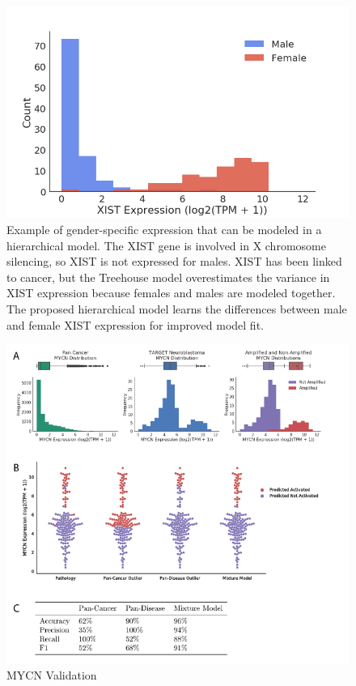 \documentclass[fleqn,10pt]{wlscirep}
\begin{document}
\begin{figure}
\centering
\includegraphics[width=0.75\linewidth]{images/xist-fig-2017-12-28.png}
\caption{Example of gender-specific expression that can be modeled in a hierarchical model. The XIST gene is involved in X chromosome silencing, so XIST is not expressed for males. XIST has been linked to cancer, but the Treehouse model overestimates the variance in XIST expression because females and males are modeled together. The proposed hierarchical model learns the differences between male and female XIST expression for improved model fit.}
\label{sfig:xist}
\end{figure}



\begin{figure}
	\centering
	\includegraphics[width=0.75\linewidth]{images/MYCN-Figure.png}
	\caption{MYCN Validation}
	\label{sfig:mycn}
\end{figure}
\end{document}
